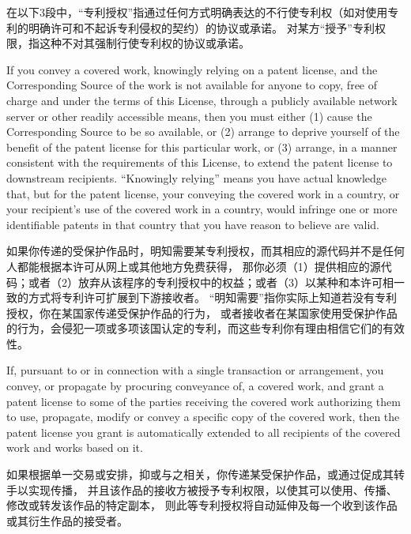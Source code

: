 \documentclass[11pt]{article}
\begin{document}
\begin{enumerate}
        在以下3段中，“专利授权”指通过任何方式明确表达的不行使专利权（如对使用专利的明确许可和不起诉专利侵权的契约）的协议或承诺。
        对某方“授予”专利权限，指这种不对其强制行使专利权的协议或承诺。

        If you convey a covered work, knowingly relying on a patent license,
        and the Corresponding Source of the work is not available for anyone
        to copy, free of charge and under the terms of this License, through a
        publicly available network server or other readily accessible means,
        then you must either (1) cause the Corresponding Source to be so
        available, or (2) arrange to deprive yourself of the benefit of the
        patent license for this particular work, or (3) arrange, in a manner
        consistent with the requirements of this License, to extend the patent
        license to downstream recipients.  ``Knowingly relying'' means you have
        actual knowledge that, but for the patent license, your conveying the
        covered work in a country, or your recipient's use of the covered work
        in a country, would infringe one or more identifiable patents in that
        country that you have reason to believe are valid.

        如果你传递的受保护作品时，明知需要某专利授权，而其相应的源代码并不是任何人都能根据本许可从网上或其他地方免费获得，
        那你必须（1）提供相应的源代码；或者（2）放弃从该程序的专利授权中的权益；或者（3）以某种和本许可相一致的方式将专利许可扩展到下游接收者。
        “明知需要”指你实际上知道若没有专利授权，你在某国家传递受保护作品的行为，
        或者接收者在某国家使用受保护作品的行为，会侵犯一项或多项该国认定的专利，而这些专利你有理由相信它们的有效性。

        If, pursuant to or in connection with a single transaction or
        arrangement, you convey, or propagate by procuring conveyance of, a
        covered work, and grant a patent license to some of the parties
        receiving the covered work authorizing them to use, propagate, modify
        or convey a specific copy of the covered work, then the patent license
        you grant is automatically extended to all recipients of the covered
        work and works based on it.

        如果根据单一交易或安排，抑或与之相关，你传递某受保护作品，或通过促成其转手以实现传播，
        并且该作品的接收方被授予专利权限，以使其可以使用、传播、修改或转发该作品的特定副本，
        则此等专利授权将自动延伸及每一个收到该作品或其衍生作品的接受者。


\end{enumerate}
\end{document}

